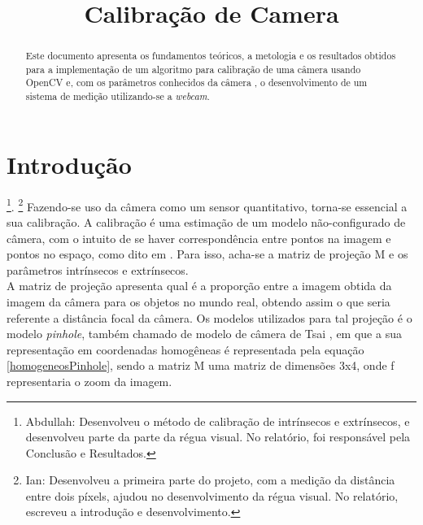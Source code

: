 \documentclass{bmvc2k}
\title{Calibração de Camera}
\begin{document}
\maketitle

\begin{abstract}
Este documento apresenta os fundamentos teóricos, a metologia e os resultados obtidos para a implementação de um algoritmo para calibração de uma câmera usando OpenCV \cite{opencv_library} e, com os parâmetros conhecidos da câmera , o desenvolvimento de um sistema de medição utilizando-se a {\em webcam}.
\end{abstract}

\section{Introdução}
\label{sec:intro}
\footnote{Abdullah: Desenvolveu o método de calibração de intrínsecos e extrínsecos, e desenvolveu parte da parte da régua visual. No relatório, foi responsável pela Conclusão e Resultados.}.
\footnote{Ian: Desenvolveu a primeira parte do projeto, com a medição da distância entre dois píxels, ajudou no desenvolvimento da régua visual. No relatório, escreveu a introdução e desenvolvimento.}
Fazendo-se uso da câmera como um sensor quantitativo, torna-se essencial a sua calibração. A calibração é uma estimação de um modelo não-configurado de câmera, com o intuito de se haver correspondência entre pontos na imagem e pontos no espaço, como dito em \cite{Horn01}. Para isso, acha-se a matriz de projeção M e os parâmetros intrínsecos e extrínsecos.\\
A matriz de projeção apresenta qual é a proporção entre a imagem obtida da imagem da câmera para os objetos no mundo real, obtendo assim o que seria referente a distância focal da câmera. Os modelos utilizados para tal projeção é o modelo {\em pinhole}, também chamado de modelo de câmera de Tsai \cite{Dias01}, em que a sua representação em coordenadas homogêneas é representada pela equação \ref{homogeneosPinhole}, sendo a matriz M uma matriz de dimensões 3x4, onde f representaria o zoom da imagem.\\
\end{document}
